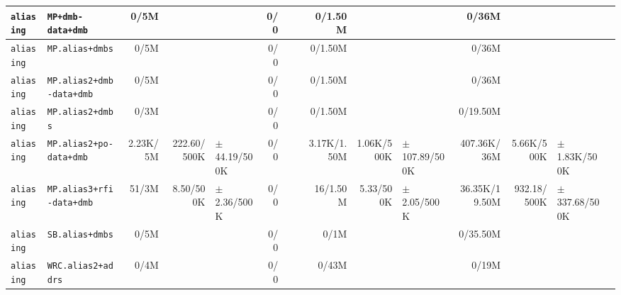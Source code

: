 \begin{tabular}{l l  | r r l | r r l | r r l | r r l l}
       \verb|aliasing| &                                      \verb|MP+dmb-data+dmb| &           0/5M &                       &                   &            0/0 &                       &  &        0/1.50M &                       &                   &          0/36M &                       &                    & \\ \hline 
       \verb|aliasing| &                                        \verb|MP.alias+dmbs| &           0/5M &                       &                   &            0/0 &                       &  &        0/1.50M &                       &                   &          0/36M &                       &                    & \\ \hline 
       \verb|aliasing| &                               \verb|MP.alias2+dmb-data+dmb| &           0/5M &                       &                   &            0/0 &                       &  &        0/1.50M &                       &                   &          0/36M &                       &                    & \\ \hline 
       \verb|aliasing| &                                       \verb|MP.alias2+dmbs| &           0/3M &                       &                   &            0/0 &                       &  &        0/1.50M &                       &                   &       0/19.50M &                       &                    & \\ \hline 
       \verb|aliasing| &                                \verb|MP.alias2+po-data+dmb| &       2.23K/5M &           222.60/500K &  $\pm$ 44.19/500K &            0/0 &                       &  &    3.17K/1.50M &            1.06K/500K & $\pm$ 107.89/500K &    407.36K/36M &            5.66K/500K &   $\pm$ 1.83K/500K & \\ \hline 
       \verb|aliasing| &                               \verb|MP.alias3+rfi-data+dmb| &          51/3M &             8.50/500K &   $\pm$ 2.36/500K &            0/0 &                       &  &       16/1.50M &             5.33/500K &   $\pm$ 2.05/500K &  36.35K/19.50M &           932.18/500K &  $\pm$ 337.68/500K & \\ \hline 
       \verb|aliasing| &                                        \verb|SB.alias+dmbs| &           0/5M &                       &                   &            0/0 &                       &  &           0/1M &                       &                   &       0/35.50M &                       &                    & \\ \hline 
       \verb|aliasing| &                                     \verb|WRC.alias2+addrs| &           0/4M &                       &                   &            0/0 &                       &  &          0/43M &                       &                   &          0/19M &                       &                    & \\ \hline 

\end{tabular}
